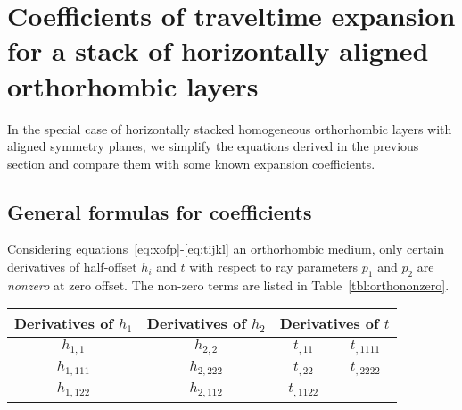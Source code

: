 \section{ Coefficients of traveltime expansion for a stack of horizontally aligned orthorhombic layers}

In the special case of horizontally stacked homogeneous orthorhombic layers with aligned symmetry planes, we simplify the equations derived in the previous section and compare them with some known expansion coefficients.

\subsection{General formulas for coefficients}

Considering equations~\ref{eq:xofp}-\ref{eq:tijkl}  an orthorhombic medium, only certain derivatives of half-offset $h_i$ and $t$ with respect to ray parameters $p_1$ and $p_2$ are \textit{nonzero} at zero offset. The non-zero terms are listed in  Table~\ref{tbl:orthononzero}.

{
\centering
     	     \begin{tabular}{|c | c | c c |}
     	     \hline Derivatives of $h_1$ & Derivatives of $h_2$  &\multicolumn{2}{|c|}{Derivatives of $t$} \\ 
            \hline $h_{1,1} $ & $h_{2,2} $ & $t_{,11} $ & $t_{,1111} $ \\ 
            $h_{1,111} $ & $h_{2,222} $ & $t_{,22} $ & $t_{,2222} $ \\ 
            $h_{1,122} $ & $h_{2,112} $ & $t_{,1122} $ & \\ 
            \hline
    \end{tabular}
}

